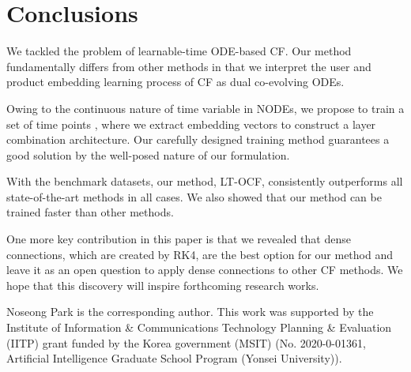 \documentclass[sigconf]{acmart}
\begin{document}
\section{Conclusions}
We tackled the problem of learnable-time ODE-based CF. Our method fundamentally differs from other methods in that we interpret the user and product embedding learning process of CF as dual co-evolving ODEs.

Owing to the continuous nature of time variable  in NODEs, we propose to train a set of time points , where we extract embedding vectors to construct a layer combination architecture. Our carefully designed training method guarantees a good solution by the well-posed nature of our formulation.

With the  benchmark datasets, our method, LT-OCF, consistently outperforms all state-of-the-art methods in all cases. We also showed that our method can be trained faster than other methods.

One more key contribution in this paper is that we revealed that dense connections, which are created by RK4, are the best option for our method and leave it as an open question to apply dense connections to other CF methods. We hope that this discovery will inspire forthcoming research works.

\begin{acks}
Noseong Park is the corresponding author. This work was supported by the Institute of Information \& Communications Technology Planning \& Evaluation (IITP) grant funded by the Korea government (MSIT) (No. 2020-0-01361, Artificial Intelligence Graduate School Program (Yonsei University)).
\end{acks}

\clearpage



\end{document}
